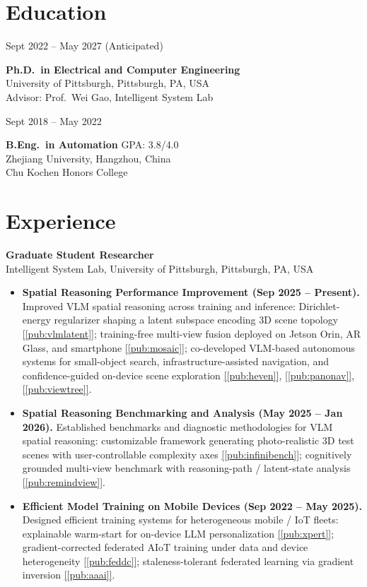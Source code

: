 \documentclass[11pt, letterpaper]{article}
\newenvironment{datedentry}[1]{%
  \par\noindent
  \begin{minipage}[t]{2.8cm}\raggedright\small #1\end{minipage}%
  \hspace{0.3cm}%
  \begin{minipage}[t]{\dimexpr\linewidth-3.1cm\relax}\raggedright
}{\end{minipage}\par\medskip}
\newcommand{\citeref}[1]{\hyperref[#1]{[\ref*{#1}]}}
\begin{document}
\section{Education}

\begin{datedentry}{Sept 2022 -- May 2027 (Anticipated)}
\textbf{Ph.D.\ in Electrical and Computer Engineering}\\
University of Pittsburgh, Pittsburgh, PA, USA\\
Advisor: Prof.\ Wei Gao, Intelligent System Lab
\end{datedentry}

\begin{datedentry}{Sept 2018 -- May 2022}
\textbf{B.Eng.\ in Automation} \hfill GPA: 3.8/4.0\\
Zhejiang University, Hangzhou, China\\
Chu Kochen Honors College
\end{datedentry}

\section{Experience}


\textbf{Graduate Student Researcher}\\
Intelligent System Lab, University of Pittsburgh, Pittsburgh, PA, USA
\begin{itemize}[leftmargin=1.1em, itemsep=2pt, topsep=3pt]
  \item \textbf{Spatial Reasoning Performance Improvement (Sep 2025 -- Present).} Improved VLM spatial reasoning across training and inference: Dirichlet-energy regularizer shaping a latent subspace encoding 3D scene topology \citeref{pub:vlmlatent}; training-free multi-view fusion deployed on Jetson Orin, AR Glass, and smartphone \citeref{pub:mosaic}; co-developed VLM-based autonomous systems for small-object search, infrastructure-assisted navigation, and confidence-guided on-device scene exploration \citeref{pub:heven}, \citeref{pub:panonav}, \citeref{pub:viewtree}.

  \item \textbf{Spatial Reasoning Benchmarking and Analysis (May 2025 -- Jan 2026).} Established benchmarks and diagnostic methodologies for VLM spatial reasoning: customizable framework generating photo-realistic 3D test scenes with user-controllable complexity axes \citeref{pub:infinibench}; cognitively grounded multi-view benchmark with reasoning-path / latent-state analysis \citeref{pub:remindview}.

  \item \textbf{Efficient Model Training on Mobile Devices (Sep 2022 -- May 2025).} Designed efficient training systems for heterogeneous mobile / IoT fleets: explainable warm-start for on-device LLM personalization \citeref{pub:xpert}; gradient-corrected federated AIoT training under data and device heterogeneity \citeref{pub:feddc}; staleness-tolerant federated learning via gradient inversion \citeref{pub:aaai}.

\end{itemize}
\end{document}
